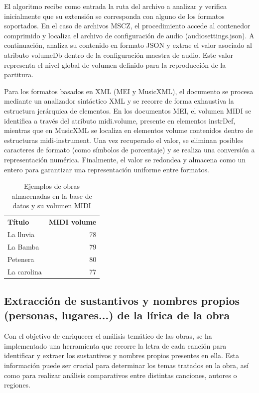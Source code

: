 El algoritmo recibe como entrada la ruta del archivo a analizar y verifica inicialmente que su extensión se corresponda con alguno de los formatos soportados. En el caso de archivos MSCZ, el procedimiento accede al contenedor comprimido y localiza el archivo de configuración de audio (audiosettings.json). A continuación, analiza su contenido en formato JSON y extrae el valor asociado al atributo volumeDb dentro de la configuración maestra de audio. Este valor representa el nivel global de volumen definido para la reproducción de la partitura.

Para los formatos basados en XML (MEI y MusicXML), el documento se procesa mediante un analizador sintáctico XML y se recorre de forma exhaustiva la estructura jerárquica de elementos. En los documentos MEI, el volumen MIDI se identifica a través del atributo midi.volume, presente en elementos instrDef, mientras que en MusicXML se localiza en elementos volume contenidos dentro de estructuras midi-instrument. Una vez recuperado el valor, se eliminan posibles caracteres de formato (como símbolos de porcentaje) y se realiza una conversión a representación numérica. Finalmente, el valor se redondea y almacena como un entero para garantizar una representación uniforme entre formatos.

\begin{table}[H]
\centering
\begin{tabular}{lr}
\textbf{Título} & \textbf{MIDI volume} \\
La lluvia & 78 \\
La Bamba & 79 \\
Petenera & 80 \\
La carolina & 77 \\
\end{tabular}
\caption{Ejemplos de obras almacenadas en la base de datos y su volumen MIDI}
\end{table}

\subsection{Extracción de sustantivos y nombres propios (personas, lugares...) de la lírica de la obra}
Con el objetivo de enriquecer el análisis temático de las obras, se ha implementado una herramienta que recorre la letra de cada canción para identificar y extraer los sustantivos y nombres propios presentes en ella. Esta información puede ser crucial para determinar los temas tratados en la obra, así como para realizar análisis comparativos entre distintas canciones, autores o regiones.

